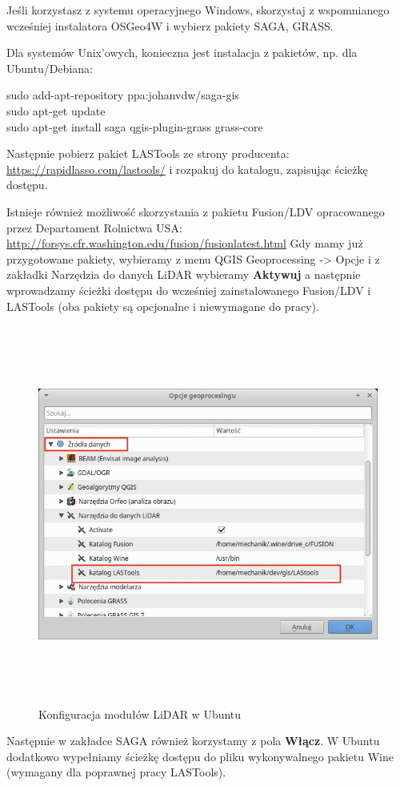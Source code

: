 \documentclass[12pt,a4paper]{book}
\begin{document}
Jeśli korzystasz z systemu operacyjnego Windows, skorzystaj z wspomnianego wcześniej instalatora OSGeo4W i wybierz pakiety SAGA, GRASS.

Dla systemów Unix'owych, konieczna jest instalacja z pakietów, np. dla Ubuntu/Debiana:


sudo add-apt-repository ppa:johanvdw/saga-gis 
\\sudo apt-get update
\\sudo apt-get install saga qgis-plugin-grass grass-core


Następnie pobierz pakiet LASTools ze strony producenta: \url{https://rapidlasso.com/lastools/} i rozpakuj do katalogu, zapisując ścieżkę dostępu.

Istnieje również możliwość skorzystania z pakietu Fusion/LDV opracowanego przez Departament Rolnictwa USA: \url{http://forsys.cfr.washington.edu/fusion/fusionlatest.html} Gdy mamy już przygotowane pakiety, wybieramy z menu QGIS Geoprocessing -{\textgreater} Opcje i z zakładki Narzędzia do danych LiDAR wybieramy \textbf{Aktywuj }a następnie wprowadzamy ścieżki dostępu do wcześniej zainstalowanego Fusion/LDV i LASTools (oba pakiety są opcjonalne i niewymagane do pracy).



\begin{center}
\begin{figure}
\includegraphics[width=16.838cm,height=12.457cm]{002-lidar.jpg}
\caption{Konfiguracja modułów LiDAR w Ubuntu}
\end{figure} 
\end{center}
Następnie w zakładce SAGA również korzystamy z pola \textbf{Włącz}. W Ubuntu dodatkowo wypełniamy ścieżkę dostępu do pliku wykonywalnego pakietu Wine (wymagany dla poprawnej pracy LASTools).
\end{document}
